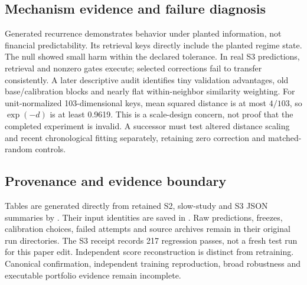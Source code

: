 \subsection{Mechanism evidence and failure diagnosis}
Generated recurrence demonstrates behavior under planted information, not financial predictability. Its retrieval keys directly include the planted regime state. The null showed small harm within the declared tolerance. In real S3 predictions, retrieval and nonzero gates execute; selected corrections fail to transfer consistently. A later descriptive audit identifies tiny validation advantages, old base/calibration blocks and nearly flat within-neighbor similarity weighting. For unit-normalized 103-dimensional keys, mean squared distance is at most $4/103$, so $\exp(-d)$ is at least 0.9619. This is a scale-design concern, not proof that the completed experiment is invalid. A successor must test altered distance scaling and recent chronological fitting separately, retaining zero correction and matched-random controls.

\subsection{Provenance and evidence boundary}
Tables are generated directly from retained S2, slow-study and S3 JSON summaries by . Their input identities are saved in . Raw predictions, freezes, calibration choices, failed attempts and source archives remain in their original run directories. The S3 receipt records 217 regression passes, not a fresh test run for this paper edit. Independent score reconstruction is distinct from retraining. Canonical confirmation, independent training reproduction, broad robustness and executable portfolio evidence remain incomplete.
